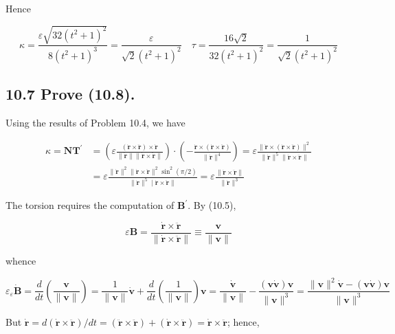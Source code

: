 \documentclass[10pt]{article}
\begin{document}
Hence

$$
\kappa=\frac{\varepsilon \sqrt{32\left(t^{2}+1\right)^{2}}}{8\left(t^{2}+1\right)^{3}}=\frac{\varepsilon}{\sqrt{2}\left(t^{2}+1\right)^{2}} \quad \tau=\frac{16 \sqrt{2}}{32\left(t^{2}+1\right)^{2}}=\frac{1}{\sqrt{2}\left(t^{2}+1\right)^{2}}
$$

\subsection*{10.7 Prove (10.8).}
Using the results of Problem 10.4, we have

$$
\begin{aligned}
\kappa=\mathbf{N T}^{\prime} & =\left(\varepsilon \frac{(\dot{\mathbf{r}} \times \ddot{\mathbf{r}}) \times \dot{\mathbf{r}}}{\|\dot{\mathbf{r}}\|\|\dot{\mathbf{r}} \times \ddot{\mathbf{r}}\|}\right) \cdot\left(-\frac{\dot{\mathbf{r}} \times(\dot{\mathbf{r}} \times \ddot{\mathbf{r}})}{\|\dot{\mathbf{r}}\|^{4}}\right)=\varepsilon \frac{\|\dot{\mathbf{r}} \times(\dot{\mathbf{r}} \times \ddot{\mathbf{r}})\|^{2}}{\|\dot{\mathbf{r}}\|^{5}\|\dot{\mathbf{r}} \times \ddot{\mathbf{r}}\|} \\
& =\varepsilon \frac{\|\dot{\mathbf{r}}\|^{2}\|\dot{\mathbf{r}} \times \ddot{\mathbf{r}}\|^{2} \sin ^{2}(\pi / 2)}{\|\dot{\mathbf{r}}\|^{5} \mid \dot{\mathbf{r}} \times \ddot{\mathbf{r}} \|}=\varepsilon \frac{\|\dot{\mathbf{r}} \times \ddot{\mathbf{r}}\|}{\|\dot{\mathbf{r}}\|^{3}}
\end{aligned}
$$

The torsion requires the computation of $\mathbf{B}^{\prime}$. By (10.5),

$$
\varepsilon \mathbf{B}=\frac{\dot{\mathbf{r}} \times \ddot{\mathbf{r}}}{\|\dot{\mathbf{r}} \times \ddot{\mathbf{r}}\|} \equiv \frac{\mathbf{v}}{\|\mathbf{v}\|}
$$

whence

$$
\varepsilon_{\varepsilon} \dot{\mathbf{B}}=\frac{d}{d t}\left(\frac{\mathbf{v}}{\|\mathbf{v}\|}\right)=\frac{1}{\|\mathbf{v}\|} \dot{\mathbf{v}}+\frac{d}{d t}\left(\frac{1}{\|\mathbf{v}\|}\right) \mathbf{v}=\frac{\dot{\mathbf{v}}}{\|\mathbf{v}\|}-\frac{(\mathbf{v} \dot{\mathbf{v}}) \mathbf{v}}{\|\mathbf{v}\|^{3}}=\frac{\|\mathbf{v}\|^{2} \dot{\mathbf{v}}-(\mathbf{v} \dot{\mathbf{v}}) \mathbf{v}}{\|\mathbf{v}\|^{3}}
$$

But $\dot{\mathbf{r}}=d(\dot{\mathbf{r}} \times \ddot{\mathbf{r}}) / d t=(\ddot{\mathbf{r}} \times \ddot{\mathbf{r}})+(\dot{\mathbf{r}} \times \ddot{\mathbf{r}})=\dot{\mathbf{r}} \times \ddot{\mathbf{r}}$; hence,
\end{document}
